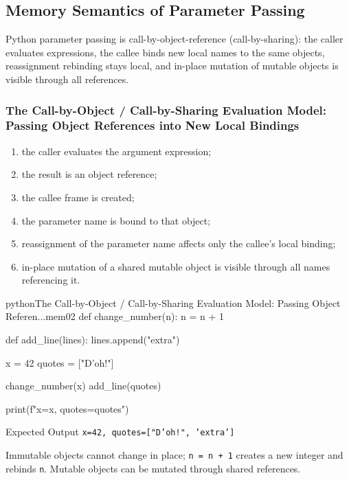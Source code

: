 \documentclass[a4paper,twoside]{report}
\begin{document}
\subsection{Memory Semantics of Parameter Passing}

Python parameter passing is call-by-object-reference (call-by-sharing): the caller evaluates expressions, the callee binds new local names to the same objects, reassignment rebinding stays local, and in-place mutation of mutable objects is visible through all references.

\subsubsection{The Call-by-Object / Call-by-Sharing Evaluation Model: Passing Object References into New Local Bindings}

\begin{enumerate}
    \item the caller evaluates the argument expression;
    \item the result is an object reference;
    \item the callee frame is created;
    \item the parameter name is bound to that object;
    \item reassignment of the parameter name affects only the callee's local binding;
    \item in-place mutation of a shared mutable object is visible through all names referencing it.
\end{enumerate}

\begin{codebox}[]{python}{The Call-by-Object / Call-by-Sharing Evaluation Model: Passing Object Referen...}{mem02}
def change_number(n):
    n = n + 1

def add_line(lines):
    lines.append("extra")

x = 42
quotes = ["D'oh!"]

change_number(x)
add_line(quotes)

print(f"x={x}, quotes={quotes}")
\end{codebox}


\begin{iobox}{Expected Output}
\texttt{x=42, quotes=["D'oh!", 'extra']} \\
\end{iobox}




Immutable objects cannot change in place; \texttt{n = n + 1} creates a new integer and rebinds \texttt{n}. Mutable objects can be mutated through shared references.
\end{document}
